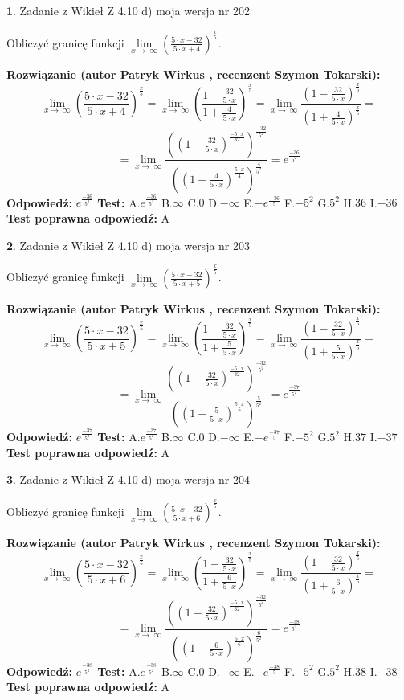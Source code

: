 \documentclass[12pt, a4paper]{article}
\theoremstyle{definition} %
\newtheorem{zad}{}
\newcommand{\zadStart}[1]{\begin{zad}#1\newline}
\newcommand{\zadStop}{\end{zad}}
\newcommand{\rozwStart}[2]{\noindent \textbf{Rozwiązanie (autor #1 , recenzent #2): }\newline}
\newcommand{\rozwStop}{\newline}
\newcommand{\odpStart}{\noindent \textbf{Odpowiedź:}\newline}
\newcommand{\odpStop}{\newline}
\newcommand{\testStart}{\noindent \textbf{Test:}\newline}
\newcommand{\testStop}{\newline}
\newcommand{\kluczStart}{\noindent \textbf{Test poprawna odpowiedź:}\newline}
\newcommand{\kluczStop}{\newline}
\begin{document}
\zadStart{Zadanie z Wikieł Z 4.10 d) moja wersja nr 202}


Obliczyć granicę funkcji  $\lim\limits_{x\to\ \infty}(\frac{5\cdot x-32}{5\cdot x+4})^{\frac{x}{5}}$.
\zadStop
\rozwStart{Patryk Wirkus}{Szymon Tokarski}
$$\lim\limits_{x\to\ \infty}(\frac{5\cdot x-32}{5\cdot x+4})^{\frac{x}{5}} = \lim\limits_{x\to\ \infty}(\frac{1-\frac{32}{5\cdot x}}{1+\frac{4}{5\cdot x}})^{\frac{x}{5}}=\lim\limits_{x\to\ \infty}\frac{(1-\frac{32}{5\cdot x})^{\frac{x}{5}}}{(1+\frac{4}{5\cdot x})^{\frac{x}{5}}}=$$
$$=\lim\limits_{x\to\ \infty}\frac{((1-\frac{32}{5\cdot x})^{\frac{-5\cdot x}{32}})^{\frac{-32}{5^{2}}}}{((1+\frac{4}{5\cdot x})^{\frac{5\cdot x}{4}})^{\frac{4}{5^{2}}}}=e^{\frac{-36}{5^{2}}}$$
\rozwStop
\odpStart
$e^{\frac{-36}{5^{2}}}$
\odpStop
\testStart
A.$e^{\frac{-36}{5^{2}}}$ B.$\infty$ C.$0$ D.$-\infty$ E.$-e^{\frac{-36}{5}}$
F.$-5^{2}$ G.$5^{2}$
H.$36$
I.$-36$
\testStop
\kluczStart
A
\kluczStop



\zadStart{Zadanie z Wikieł Z 4.10 d) moja wersja nr 203}


Obliczyć granicę funkcji  $\lim\limits_{x\to\ \infty}(\frac{5\cdot x-32}{5\cdot x+5})^{\frac{x}{5}}$.
\zadStop
\rozwStart{Patryk Wirkus}{Szymon Tokarski}
$$\lim\limits_{x\to\ \infty}(\frac{5\cdot x-32}{5\cdot x+5})^{\frac{x}{5}} = \lim\limits_{x\to\ \infty}(\frac{1-\frac{32}{5\cdot x}}{1+\frac{5}{5\cdot x}})^{\frac{x}{5}}=\lim\limits_{x\to\ \infty}\frac{(1-\frac{32}{5\cdot x})^{\frac{x}{5}}}{(1+\frac{5}{5\cdot x})^{\frac{x}{5}}}=$$
$$=\lim\limits_{x\to\ \infty}\frac{((1-\frac{32}{5\cdot x})^{\frac{-5\cdot x}{32}})^{\frac{-32}{5^{2}}}}{((1+\frac{5}{5\cdot x})^{\frac{5\cdot x}{5}})^{\frac{5}{5^{2}}}}=e^{\frac{-37}{5^{2}}}$$
\rozwStop
\odpStart
$e^{\frac{-37}{5^{2}}}$
\odpStop
\testStart
A.$e^{\frac{-37}{5^{2}}}$ B.$\infty$ C.$0$ D.$-\infty$ E.$-e^{\frac{-37}{5}}$
F.$-5^{2}$ G.$5^{2}$
H.$37$
I.$-37$
\testStop
\kluczStart
A
\kluczStop



\zadStart{Zadanie z Wikieł Z 4.10 d) moja wersja nr 204}


Obliczyć granicę funkcji  $\lim\limits_{x\to\ \infty}(\frac{5\cdot x-32}{5\cdot x+6})^{\frac{x}{5}}$.
\zadStop
\rozwStart{Patryk Wirkus}{Szymon Tokarski}
$$\lim\limits_{x\to\ \infty}(\frac{5\cdot x-32}{5\cdot x+6})^{\frac{x}{5}} = \lim\limits_{x\to\ \infty}(\frac{1-\frac{32}{5\cdot x}}{1+\frac{6}{5\cdot x}})^{\frac{x}{5}}=\lim\limits_{x\to\ \infty}\frac{(1-\frac{32}{5\cdot x})^{\frac{x}{5}}}{(1+\frac{6}{5\cdot x})^{\frac{x}{5}}}=$$
$$=\lim\limits_{x\to\ \infty}\frac{((1-\frac{32}{5\cdot x})^{\frac{-5\cdot x}{32}})^{\frac{-32}{5^{2}}}}{((1+\frac{6}{5\cdot x})^{\frac{5\cdot x}{6}})^{\frac{6}{5^{2}}}}=e^{\frac{-38}{5^{2}}}$$
\rozwStop
\odpStart
$e^{\frac{-38}{5^{2}}}$
\odpStop
\testStart
A.$e^{\frac{-38}{5^{2}}}$ B.$\infty$ C.$0$ D.$-\infty$ E.$-e^{\frac{-38}{5}}$
F.$-5^{2}$ G.$5^{2}$
H.$38$
I.$-38$
\testStop
\kluczStart
A
\kluczStop
\end{document}
